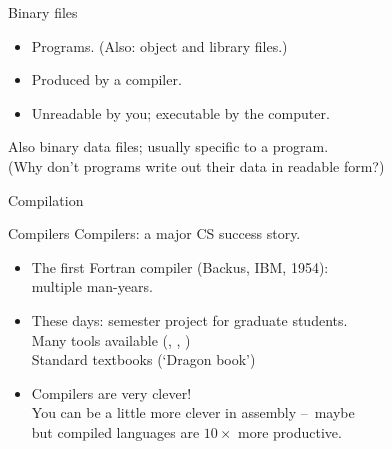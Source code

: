 \documentclass[11pt,headernav]{beamer}
\begin{document}
\begin{numberedframe}{Binary files}
  \label{sl-tut:bin-file}
  \begin{itemize}
  \item Programs. (Also: object and library files.)
  \item Produced by a compiler. 
  \item Unreadable by you; executable by the computer.
  \end{itemize}
  Also binary data files; usually specific to a program.\\
  (Why don't programs write out their data in readable form?)
\end{numberedframe}

 {Compilation}

\begin{numberedframe}{Compilers}
  Compilers: a major CS success story.
  \begin{itemize}
  \item The first Fortran compiler (Backus, IBM, 1954):\\
    multiple man-years.
  \item These days: semester project for graduate students.\\
    Many tools available (, , )\\
    Standard textbooks (`Dragon book')
  \item Compilers are very clever!\\
    You can be a little more clever in assembly --~maybe\\
    but compiled languages are $10\times$ more productive.
  \end{itemize}
\end{numberedframe}
\end{document}
